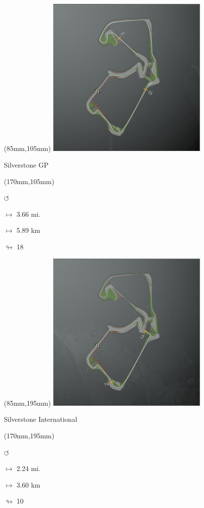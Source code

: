 \begin{textblock*}{80mm}(85mm,105mm)%
\includegraphics[width=80mm]{TR/2015-05-20_00056.png}
\centerline{Silverstone GP}
\end{textblock*}
\begin{textblock*}{30mm}(170mm,105mm)%
\par \Huge$\circlearrowleft$
\Large
\par$\mapsto$ 3.66 mi.
\par$\mapsto$ 5.89 km
\par$\looparrowright$ 18
\end{textblock*}
\begin{textblock*}{80mm}(85mm,195mm)%
\includegraphics[width=80mm]{TR/2015-05-20_00057.png}
\centerline{Silverstone International}
\end{textblock*}
\begin{textblock*}{30mm}(170mm,195mm)%
\par \Huge$\circlearrowleft$
\Large
\par$\mapsto$ 2.24 mi.
\par$\mapsto$ 3.60 km
\par$\looparrowright$ 10
\end{textblock*}
\null\newpage

